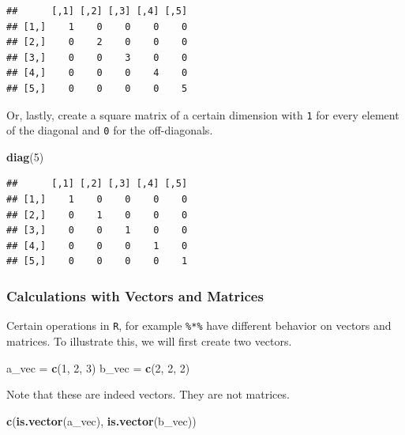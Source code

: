 \documentclass[]{book}
\newenvironment{Shaded}{\begin{snugshade}}{\end{snugshade}}
\newcommand{\KeywordTok}[1]{\textcolor[rgb]{0.13,0.29,0.53}{\textbf{#1}}}
\newcommand{\DecValTok}[1]{\textcolor[rgb]{0.00,0.00,0.81}{#1}}
\newcommand{\StringTok}[1]{\textcolor[rgb]{0.31,0.60,0.02}{#1}}
\newcommand{\NormalTok}[1]{#1}
\theoremstyle{definition}
\theoremstyle{definition}
\theoremstyle{definition}
\theoremstyle{remark}
\begin{document}
\begin{verbatim}
##      [,1] [,2] [,3] [,4] [,5]
## [1,]    1    0    0    0    0
## [2,]    0    2    0    0    0
## [3,]    0    0    3    0    0
## [4,]    0    0    0    4    0
## [5,]    0    0    0    0    5
\end{verbatim}

Or, lastly, create a square matrix of a certain dimension with
\texttt{1} for every element of the diagonal and \texttt{0} for the
off-diagonals.

\begin{Shaded}
\begin{Highlighting}[]
\KeywordTok{diag}\NormalTok{(}\DecValTok{5}\NormalTok{)}
\end{Highlighting}
\end{Shaded}

\begin{verbatim}
##      [,1] [,2] [,3] [,4] [,5]
## [1,]    1    0    0    0    0
## [2,]    0    1    0    0    0
## [3,]    0    0    1    0    0
## [4,]    0    0    0    1    0
## [5,]    0    0    0    0    1
\end{verbatim}

\subsubsection*{Calculations with Vectors and
Matrices}\label{calculations-with-vectors-and-matrices}

Certain operations in \texttt{R}, for example \texttt{\%*\%} have
different behavior on vectors and matrices. To illustrate this, we will
first create two vectors.

\begin{Shaded}
\begin{Highlighting}[]
\NormalTok{a_vec =}\StringTok{ }\KeywordTok{c}\NormalTok{(}\DecValTok{1}\NormalTok{, }\DecValTok{2}\NormalTok{, }\DecValTok{3}\NormalTok{)}
\NormalTok{b_vec =}\StringTok{ }\KeywordTok{c}\NormalTok{(}\DecValTok{2}\NormalTok{, }\DecValTok{2}\NormalTok{, }\DecValTok{2}\NormalTok{)}
\end{Highlighting}
\end{Shaded}

Note that these are indeed vectors. They are not matrices.

\begin{Shaded}
\begin{Highlighting}[]
\KeywordTok{c}\NormalTok{(}\KeywordTok{is.vector}\NormalTok{(a_vec), }\KeywordTok{is.vector}\NormalTok{(b_vec))}
\end{Highlighting}
\end{Shaded}
\end{document}
